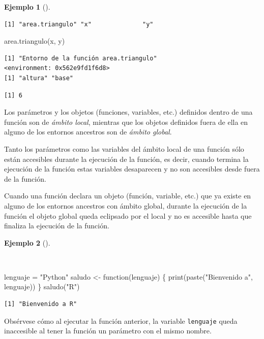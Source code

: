 \documentclass[
  a4paper,
]{scrreport}
\newenvironment{Shaded}{\begin{snugshade}}{\end{snugshade}}
\newcommand{\ControlFlowTok}[1]{\textcolor[rgb]{0.00,0.23,0.31}{#1}}
\newcommand{\FunctionTok}[1]{\textcolor[rgb]{0.28,0.35,0.67}{#1}}
\newcommand{\NormalTok}[1]{\textcolor[rgb]{0.00,0.23,0.31}{#1}}
\newcommand{\OtherTok}[1]{\textcolor[rgb]{0.00,0.23,0.31}{#1}}
\newcommand{\StringTok}[1]{\textcolor[rgb]{0.13,0.47,0.30}{#1}}
\theoremstyle{definition}
\theoremstyle{definition}
\newtheorem{example}{Ejemplo}[chapter]
\theoremstyle{remark}
\begin{document}
\begin{example}[]
\begin{verbatim}
[1] "area.triangulo" "x"              "y"             
\end{verbatim}

\begin{Shaded}
\begin{Highlighting}[]
\FunctionTok{area.triangulo}\NormalTok{(x, y)}
\end{Highlighting}
\end{Shaded}

\begin{verbatim}
[1] "Entorno de la función area.triangulo"
<environment: 0x562e9fd1f6d8>
[1] "altura" "base"  
\end{verbatim}

\begin{verbatim}
[1] 6
\end{verbatim}

\end{example}

Los parámetros y los objetos (funciones, variables, etc.) definidos
dentro de una función son de \emph{ámbito local}, mientras que los
objetos definidos fuera de ella en alguno de los entornos ancestros son
de \emph{ámbito global}.

Tanto los parámetros como las variables del ámbito local de una función
sólo están accesibles durante la ejecución de la función, es decir,
cuando termina la ejecución de la función estas variables desaparecen y
no son accesibles desde fuera de la función.

Cuando una función declara un objeto (función, variable, etc.) que ya
existe en alguno de los entornos ancestros con ámbito global, durante la
ejecución de la función el objeto global queda eclipsado por el local y
no es accesible hasta que finaliza la ejecución de la función.

\begin{example}[]\protect\hypertarget{exm-eclise-variables-globales-por-locales}{}\label{exm-eclise-variables-globales-por-locales}

~

\begin{Shaded}
\begin{Highlighting}[]
\NormalTok{lenguaje }\OtherTok{=} \StringTok{"Python"}
\NormalTok{saludo }\OtherTok{\textless{}{-}} \ControlFlowTok{function}\NormalTok{(lenguaje) \{}
  \FunctionTok{print}\NormalTok{(}\FunctionTok{paste}\NormalTok{(}\StringTok{"Bienvenido a"}\NormalTok{, lenguaje))  }
\NormalTok{\}}
\FunctionTok{saludo}\NormalTok{(}\StringTok{"R"}\NormalTok{)}
\end{Highlighting}
\end{Shaded}

\begin{verbatim}
[1] "Bienvenido a R"
\end{verbatim}

Obsérvese cómo al ejecutar la función anterior, la variable
\texttt{lenguaje} queda inaccesible al tener la función un parámetro con
el mismo nombre.

\end{example}
\end{document}
